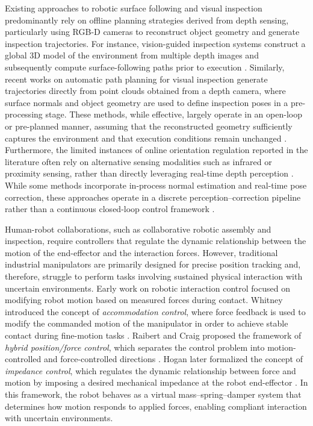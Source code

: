 \documentclass[journal]{IEEEtran}
\begin{document}
Existing approaches to robotic surface following and visual inspection predominantly rely on offline planning strategies derived from depth sensing, particularly using RGB-D cameras to reconstruct object geometry and generate inspection trajectories. For instance, vision-guided inspection systems construct a global 3D model of the environment from multiple depth images and subsequently compute surface-following paths prior to execution \cite{nakhaeinia2016surface}. Similarly, recent works on automatic path planning for visual inspection generate trajectories directly from point clouds obtained from a depth camera, where surface normals and object geometry are used to define inspection poses in a pre-processing stage. These methods, while effective, largely operate in an open-loop or pre-planned manner, assuming that the reconstructed geometry sufficiently captures the environment and that execution conditions remain unchanged \cite{tasneem2023automatic}. Furthermore, the limited instances of online orientation regulation reported in the literature often rely on alternative sensing modalities such as infrared or proximity sensing, rather than directly leveraging real-time depth perception \cite{nakhaeinia2018hybrid}. While some methods incorporate in-process normal estimation and real-time pose correction, these approaches operate in a discrete perception–correction pipeline rather than a continuous closed-loop control framework \cite{yang2025adaptive}.

Human-robot collaborations, such as collaborative robotic assembly and inspection, require controllers that regulate the dynamic relationship between the motion of the end-effector and the interaction forces.
However, traditional industrial manipulators are primarily designed for precise position tracking and, therefore, struggle to perform tasks involving sustained physical interaction with uncertain environments. 
Early work on robotic interaction control focused on modifying robot motion based on measured forces during contact. Whitney introduced the concept of \emph{accommodation control}, where force feedback is used to modify the commanded motion of the manipulator in order to achieve stable contact during fine-motion tasks \cite{Whitney1977}. 
Raibert and Craig proposed the framework of \emph{hybrid position/force control}, which separates the control problem into motion-controlled and force-controlled directions \cite{RaibertCraig1981}. 
Hogan later formalized the concept of \emph{impedance control}, which regulates the dynamic relationship between force and motion by imposing a desired mechanical impedance at the robot end-effector \cite{Hogan1985}. In this framework, the robot behaves as a virtual mass–spring–damper system that determines how motion responds to applied forces, enabling compliant interaction with uncertain environments.
\end{document}
